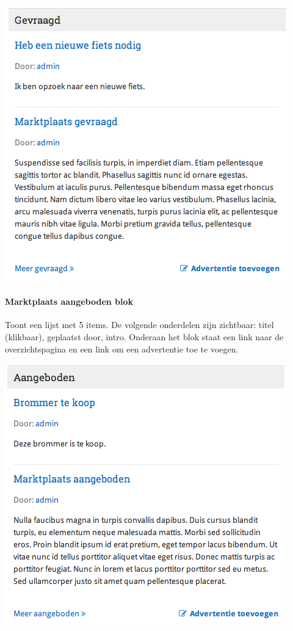 \begin{center}
	\includegraphics[scale=0.5]{img/blokken/marktplaatsgevraagd.png}
\end{center}

\paragraph{Marktplaats aangeboden blok}

Toont een lijst met 5 items. De volgende onderdelen zijn zichtbaar: titel (klikbaar), geplaatst door, intro. Onderaan het blok staat een link naar de overzichtspagina en een link om een advertentie toe te voegen.

\begin{center}
	\includegraphics[scale=0.5]{img/blokken/marktplaatsaangeboden.png}
\end{center}

